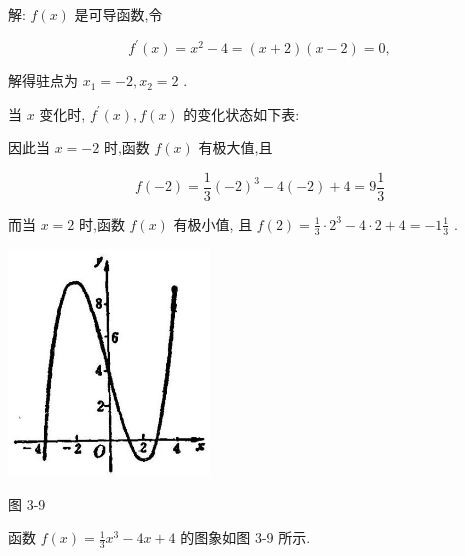 \documentclass[lang=cn,newtx,10pt,scheme=chinese]{elegantbook}
\begin{document}
解: \(f\left( x\right)\) 是可导函数,令

\[
{f}^{\prime }\left( x\right) = {x}^{2} - 4 = \left( {x + 2}\right) \left( {x - 2}\right) = 0,
\]

解得驻点为 \({x}_{1} = - 2,{x}_{2} = 2\) .

当 \(x\) 变化时, \({f}^{\prime }\left( x\right) ,f\left( x\right)\) 的变化状态如下表:

\begin{center}
\end{center}

因此当 \(x = - 2\) 时,函数 \(f\left( x\right)\) 有极大值,且

\[
f\left( {-2}\right) = \frac{1}{3}{\left( -2\right) }^{3} - 4\left( {-2}\right) + 4 = 9\frac{1}{3}
\]

而当 \(x = 2\) 时,函数 \(f\left( x\right)\) 有极小值, 且 \(f\left( 2\right) = \frac{1}{3} \cdot {2}^{3} - 4 \cdot 2 + 4 = - 1\frac{1}{3}\) .

\begin{center}
\includegraphics[max width=0.4\textwidth]{images/01912c18-5c3f-733d-b775-749ba9897a9d_143_629914.jpg}
\end{center}

图 3-9

函数 \(f\left( x\right) = \frac{1}{3}{x}^{3} - {4x} + 4\) 的图象如图 3-9 所示.
\end{document}
